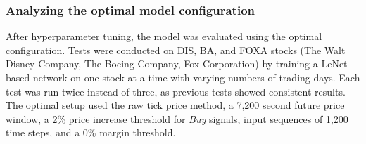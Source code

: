 \documentclass[a4paper,oneside,onecolumn,12pt]{book}
\begin{document}
		\subsubsection{Analyzing the optimal model configuration}
		After hyperparameter tuning, the model was evaluated using the optimal configuration. Tests were conducted on DIS, BA, and FOXA stocks (The Walt Disney Company, The Boeing Company, Fox Corporation) by training a LeNet based network on one stock at a time with varying numbers of trading days. Each test was run twice instead of three, as previous tests showed consistent results. The optimal setup used the raw tick price method, a 7,200 second future price window, a 2\% price increase threshold for \textit{Buy} signals, input sequences of 1,200 time steps, and a 0\% margin threshold.

		\begin{table}[H]
			\begin{center}
			\end{center}
			\caption{Testing the model with the optimal configuration.}
			\label{table:opt_model_tests}
		\end{table}
\end{document}
